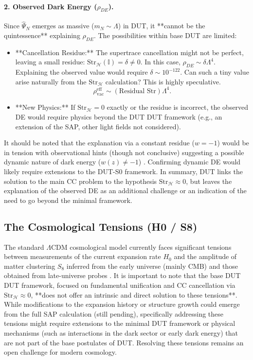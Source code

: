 \documentclass[11pt, a4paper]{article}
\theoremstyle{remark}
\newcommand{\Op}[1]{\hat{#1}}
\newcommand{\Str}{\mathrm{Str}}
\begin{document}
\paragraph{2. Observed Dark Energy (\( \rho_{DE} \)).}
Since \( \Op{\Psi}_N \) emerges as massive (\( m_N \sim \Lambda \)) in DUT, it **cannot be the quintessence** explaining \( \rho_{DE} \). The possibilities within base DUT are limited:
\begin{itemize}
    \item **Cancellation Residue:** The supertrace cancellation might not be perfect, leaving a small residue: \( \Str_{\mathcal{H}}(\mathbb{I}) = \delta \neq 0 \). In this case, \( \rho_{DE} \sim \delta \Lambda^4 \). Explaining the observed value would require \( \delta \sim 10^{-122} \). Can such a tiny value arise naturally from the \( \Str_{\mathcal{H}} \) calculation? This is highly speculative.
    \begin{equation}\label{eq:residuo_vacio_final_redux}
    \rho_{\text{vac}}^{\text{eff}} \sim (\text{Residual } \Str) \Lambda^4.
    \end{equation}
    \item **New Physics:** If \( \Str_{\mathcal{H}} = 0 \) exactly or the residue is incorrect, the observed DE would require physics beyond the DUT DUT framework (e.g., an extension of the SAP, other light fields not considered).
\end{itemize}
It should be noted that the explanation via a constant residue (\(w=-1\)) would be in tension with observational hints (though not conclusive) suggesting a possible dynamic nature of dark energy (\(w(z) \neq -1\)) \citep[see e.g., analysis in][]{DESI:2024mwx, Abdalla:2022}. Confirming dynamic DE would likely require extensions to the DUT-S0 framework.
In summary, DUT links the solution to the main CC problem to the hypothesis \( \Str_{\mathcal{H}} \approx 0 \), but leaves the explanation of the observed DE as an additional challenge or an indication of the need to go beyond the minimal framework.

\subsection{The Cosmological Tensions (H0 / S8)}
\label{sec:tensiones_cosmo}
The standard $\Lambda$CDM cosmological model currently faces significant tensions between measurements of the current expansion rate \(H_0\) and the amplitude of matter clustering \(S_8\) inferred from the early universe (mainly CMB) and those obtained from late-universe probes \citep[e.g.,][]{Abdalla:2022}. It is important to note that the base DUT DUT framework, focused on fundamental unification and CC cancellation via \(\Str_{\mathcal{H}} \approx 0\), **does not offer an intrinsic and direct solution to these tensions**. While modifications to the expansion history or structure growth could emerge from the full SAP calculation (still pending), specifically addressing these tensions might require extensions to the minimal DUT framework or physical mechanisms (such as interactions in the dark sector or early dark energy) that are not part of the base postulates of DUT. Resolving these tensions remains an open challenge for modern cosmology.
\end{document}

